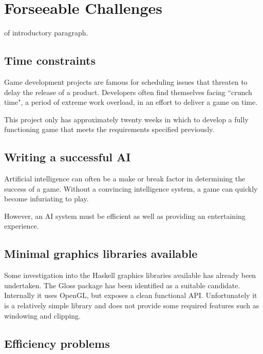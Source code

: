 \chapter[Forseeable Challenges]{Forseeable Challenges}
\label{ch:forseeable_challenges}


 of introductory paragraph.


\section{Time constraints}

Game development projects are famous for scheduling issues that threaten to delay the
release of a product. Developers often find themselves facing ``crunch time", a period
of extreme work overload, in an effort to deliver a game on time.\cite{groen2011}

This project only has approximately twenty weeks in which to develop a fully functioning
game that meets the requirements specified previously.

\section{Writing a successful AI}

Artificial intelligence can often be a make or break factor in determining the success of
a game. Without a convincing intelligence system, a game can
quickly become infuriating to play.

However, an AI system must be efficient as well as providing an entertaining experience.

\section{Minimal graphics libraries available}

Some investigation into the Haskell graphics libraries available has already been undertaken.
The Gloss package has been identified as a suitable candidate. Internally it
uses OpenGL, but exposes a clean functional API. Unfortunately it is a relatively simple
library and does not provide some required features such as windowing and clipping.

\section{Efficiency problems}
